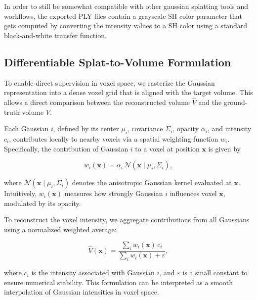 \documentclass[runningheads]{llncs}
\begin{document}
In order to still be somewhat compatible with other gaussian splatting tools and workflows, the exported PLY files contain a grayscale SH color parameter that gets computed by converting the intensity values to a SH color using a standard black-and-white transfer function.

\subsection{Differentiable Splat-to-Volume Formulation}

To enable direct supervision in voxel space, we rasterize the Gaussian representation into a dense voxel grid that is aligned with the target volume. This allows a direct comparison between the reconstructed volume $\hat{V}$ and the ground-truth volume $V$.

Each Gaussian $i$, defined by its center $\mu_i$, covariance $\Sigma_i$, opacity $\alpha_i$, and intensity $c_i$, contributes locally to nearby voxels via a spatial weighting function $w_i$. Specifically, the contribution of Gaussian $i$ to a voxel at position $\mathbf{x}$ is given by

\begin{equation}
w_i(\mathbf{x}) = \alpha_i \, \mathcal{N}(\mathbf{x} \mid \mu_i, \Sigma_i),
\end{equation}

where $\mathcal{N}(\mathbf{x} \mid \mu_i, \Sigma_i)$ denotes the anisotropic Gaussian kernel evaluated at $\mathbf{x}$. Intuitively, $w_i(\mathbf{x})$ measures how strongly Gaussian $i$ influences voxel $\mathbf{x}$, modulated by its opacity.

To reconstruct the voxel intensity, we aggregate contributions from all Gaussians using a normalized weighted average:

\begin{equation}
\hat{V}(\mathbf{x}) = 
\frac{\sum_i w_i(\mathbf{x}) \, c_i}{\sum_i w_i(\mathbf{x}) + \varepsilon},
\end{equation}

where $c_i$ is the intensity associated with Gaussian $i$, and $\varepsilon$ is a small constant to ensure numerical stability. This formulation can be interpreted as a smooth interpolation of Gaussian intensities in voxel space.


\end{document}

